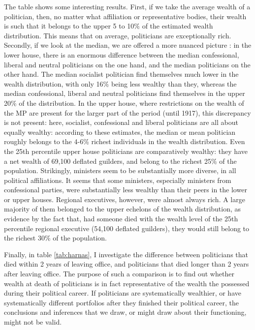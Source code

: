     The table shows some interesting results. First, if we take the average wealth of a politician, then, no matter what affiliation or representative bodies, their wealth is such that it belongs to the upper 5 to 10\% of the estimated wealth distribution. This means that on average, politicians are exceptionally rich. Secondly, if we look at the median, we are offered a more nuanced picture : in the lower house, there is an enormous difference between the median confessional, liberal and neutral politicians on the one hand, and the median politicians on the other hand. The median socialist politician find themselves much lower in the wealth distribution, with only 16\% being less wealthy than they, whereas the median confessional, liberal and neutral politicians find themselves in the upper 20\% of the distribution. In the upper house, where restrictions on the wealth of the MP are present for the larger part of the period (until 1917), this discrepancy is not present: here, socialist, confessional and liberal politicians are all about equally wealthy: according to these estimates, the median or mean politician roughly belongs to the 4-6\% richest individuals in the wealth distribution. Even the 25th percentile upper house politicians are comparatively wealthy: they have a net wealth of 69,100 deflated guilders, and belong to the richest 25\% of the population. Strikingly, ministers seem to be substantially more diverse, in all political affiliations. It seems that some ministers, especially ministers from confessional parties, were substantially less wealthy than their peers in the lower or upper houses. Regional executives, however, were almost always rich. A large majority of them belonged to the upper echelons of the wealth distribution, as evidence by the fact that, had someone died with the wealth level of the 25th percentile regional executive (54,100 deflated guilders), they would still belong to the richest 30\% of the population. 
    
    Finally, in table \ref{tab:harnas}, I investigate the difference between politicians that died within 2 years of leaving office, and politicians that died longer than 2 years after leaving office. The purpose of such a comparison is to find out whether wealth at death of politicians is in fact representative of the wealth the possessed during their political career. If politicians are systematically wealthier, or have systematically different portfolios after they finished their political career, the conclusions and inferences that we draw, or might draw about their functioning, might not be valid. 
    
